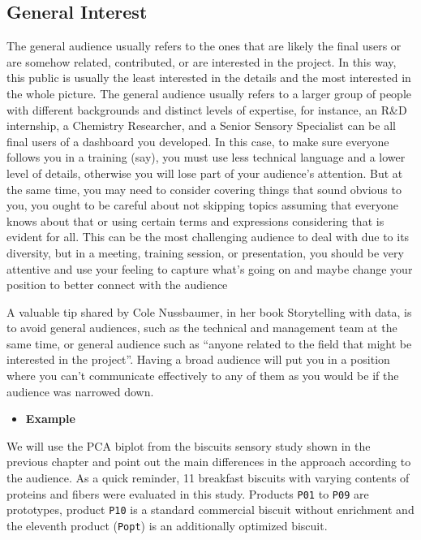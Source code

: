\documentclass[
]{krantz}
\providecommand{\tightlist}{%
  \setlength{\itemsep}{0pt}\setlength{\parskip}{0pt}}
\begin{document}
\hypertarget{general-interest}{%
\subsection{General Interest}\label{general-interest}}

The general audience usually refers to the ones that are likely the final users or are somehow related, contributed, or are interested in the project. In this way, this public is usually the least interested in the details and the most interested in the whole picture. The general audience usually refers to a larger group of people with different backgrounds and distinct levels of expertise, for instance, an R\&D internship, a Chemistry Researcher, and a Senior Sensory Specialist can be all final users of a dashboard you developed. In this case, to make sure everyone follows you in a training (say), you must use less technical language and a lower level of details, otherwise you will lose part of your audience's attention. But at the same time, you may need to consider covering things that sound obvious to you, you ought to be careful about not skipping topics assuming that everyone knows about that or using certain terms and expressions considering that is evident for all. This can be the most challenging audience to deal with due to its diversity, but in a meeting, training session, or presentation, you should be very attentive and use your feeling to capture what's going on and maybe change your position to better connect with the audience

A valuable tip shared by Cole Nussbaumer, in her book Storytelling with data, is to avoid general audiences, such as the technical and management team at the same time, or general audience such as ``anyone related to the field that might be interested in the project''. Having a broad audience will put you in a position where you can't communicate effectively to any of them as you would be if the audience was narrowed down.

\begin{itemize}
\tightlist
\item
  \textbf{Example}
\end{itemize}

We will use the PCA biplot from the biscuits sensory study shown in the previous chapter and point out the main differences in the approach according to the audience. As a quick reminder, 11 breakfast biscuits with varying contents of proteins and fibers were evaluated in this study. Products \texttt{P01} to \texttt{P09} are prototypes, product \texttt{P10} is a standard commercial biscuit without enrichment and the eleventh product (\texttt{Popt}) is an additionally optimized biscuit.
\end{document}
